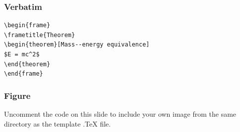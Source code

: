 \documentclass{beamer}
\begin{document}
\begin{frame}[fragile] %
\frametitle{Verbatim}
\begin{example}
\begin{verbatim}
\begin{frame}
\frametitle{Theorem}
\begin{theorem}[Mass--energy equivalence]
$E = mc^2$
\end{theorem}
\end{frame}\end{verbatim}
\end{example}
\end{frame}


\begin{frame}
\frametitle{Figure}
Uncomment the code on this slide to include your own image from the same directory as the template .TeX file.
\end{frame}
\fi

\end{document}
